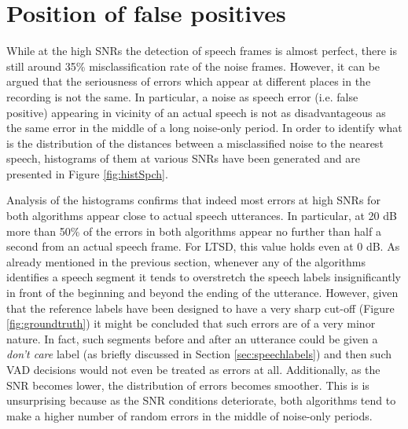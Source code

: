 \section{Position of false positives}

While at the high SNRs the detection of speech frames is almost perfect, there is still around 35\% misclassification rate of the noise frames. However, it can be argued that the seriousness of errors which appear at different places in the recording is not the same. In particular, a noise as speech error (i.e. false positive) appearing in vicinity of an actual speech is not as disadvantageous as the same error in the middle of a long noise-only period. In order to identify what is the distribution of the distances between a misclassified noise to the nearest speech, histograms of them at various SNRs have been generated and are presented in Figure \ref{fig:histSpch}.

Analysis of the histograms confirms that indeed most errors at high SNRs for both algorithms appear close to actual speech utterances. In particular, at 20 dB more than 50\% of the errors in both algorithms appear no further than half a second from an actual speech frame. For LTSD, this value holds even at 0 dB. As already mentioned in the previous section, whenever any of the algorithms identifies a speech segment it tends to overstretch the speech labels insignificantly in front of the beginning and beyond the ending of the utterance. However, given that the reference labels have been designed to have a very sharp cut-off (Figure \ref{fig:groundtruth}) it might be concluded that such errors are of a very minor nature. In fact, such segments before and after an utterance could be given a \emph{don't care} label (as briefly discussed in Section \ref{sec:speechlabels}) and then such VAD decisions would not even be treated as errors at all. Additionally, as the SNR becomes lower, the distribution of errors becomes smoother. This is is unsurprising because as the SNR conditions deteriorate, both algorithms tend to make a higher number of random errors in the middle of noise-only periods.

